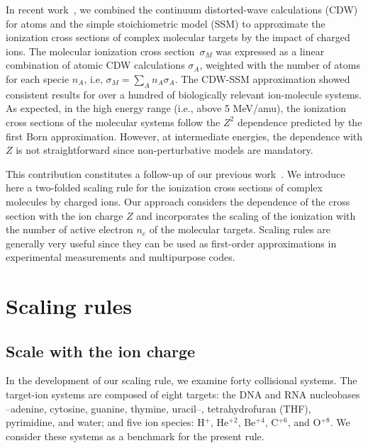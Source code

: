 \documentclass[10pt,showpacs,showkeys,twocolumn]{revtex4-1}
\begin{document}
In recent work~\cite{MendezJPB20}, we combined the continuum 
distorted-wave calculations (CDW) for atoms and the simple 
stoichiometric model (SSM) to approximate the ionization cross 
sections of complex molecular targets by the impact of charged ions. 
The molecular ionization cross section~$\sigma_M$ was expressed as 
a linear combination of atomic CDW calculations $\sigma_A$, 
weighted with the number of atoms for each specie $n_A$, i.e, 
$\sigma_M=\sum_A n_A \sigma_A$. The CDW-SSM approximation showed 
consistent results for over a hundred of biologically relevant 
ion-molecule systems. As expected, in the high energy range (i.e., 
above 5 MeV/amu), the ionization cross sections of 
the molecular systems follow the $Z^2$ dependence predicted by the 
first Born approximation. However, at intermediate 
energies, the dependence with $Z$ is not straightforward since 
non-perturbative models are mandatory.

This contribution constitutes a follow-up of our previous work~\cite{MendezJPB20}. We 
introduce here a two-folded scaling rule for the ionization cross 
sections of complex molecules by charged ions. Our approach considers 
the dependence of the cross section with the ion charge $Z$ 
and incorporates the scaling of the ionization with the number of 
active electron $n_e$ of the molecular targets. Scaling rules are 
generally very useful since they can be used as first-order 
approximations in experimental measurements and multipurpose codes. 

\section{Scaling rules}

\subsection{Scale with the ion charge}
\label{sec:zscaling}

In the development of our scaling rule, we examine forty collisional 
systems. The target-ion systems are composed of eight targets: 
the DNA and RNA nucleobases --adenine, cytosine, guanine, thymine, 
uracil--, tetrahydrofuran (THF), pyrimidine, and water; and five ion 
species: H$^+$, He$^{+2}$, Be$^{+4}$, C$^{+6}$, and O$^{+8}$. 
We consider these systems as a benchmark for the present rule. 
\end{document}
